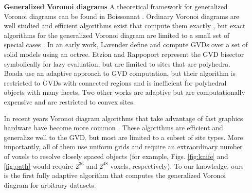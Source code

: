 \documentclass{egpubl}
\renewcommand{\paragraph}[1]{\noindent \textbf{#1}}
\begin{document}
\paragraph{Generalized Voronoi diagrams}
A theoretical framework for generalized Voronoi diagrams can be found in Boissonnat \etal {}. Ordinary Voronoi diagrams are well studied and efficient algorithms exist that compute them exactly \cite{de2008computational}, but exact algorithms for the generalized Voronoi diagram are limited to a small set of special cases \cite{lee1982medial,karavelas2004robust}. In an early work, Lavender \etal {} define and compute GVDs over a set of solid models using an octree.  Etzion and Rappoport  represent the GVD bisector symbolically for lazy evaluation, but are limited to sites that are polyhedra.  Boada \etal {} use an adaptive approach to GVD computation, but their algorithm is restricted to GVDs with connected regions and is inefficient for polyhedral objects with many facets.  Two other works are adaptive \cite{teichmann1997polygonal,vleugels1998approximating} but are computationally expensive and are restricted to convex sites.

In recent years Voronoi diagram algorithms that take advantage of fast graphics hardware have become more common \cite{cao2010parallel,fischer2006fast,hsieh2005simple,rong2007variants,sud2006interactive,sud2006fast,hoff1999fast,wu2008gpu}.  These algorithms are efficient and generalize well to the GVD, but most are limited to a subset of site types.  More importantly, all of them use uniform grids and require an extraordinary number of voxels to resolve closely spaced objects (for example, Figs. \ref{fig:knife} and \ref{fig:path} would require $2^{36}$ and $2^{48}$ voxels, respectively).  To our knowledge, ours is the first fully adaptive algorithm that computes the generalized Voronoi diagram for arbitrary datasets.  %
\end{document}
